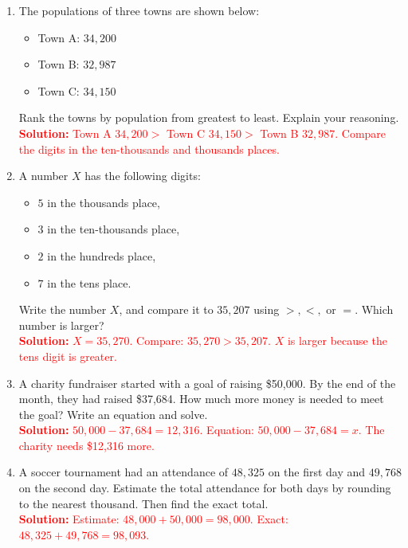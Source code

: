 \documentclass[12pt]{article}
\begin{document}
\vspace{1em}

\begin{tcolorbox}[colframe=black!60, colback=white, 
coltitle=black, colbacktitle=black!15, fonttitle=\bfseries\Large, 
title=Problems, halign title=center, left=10pt, right=10pt, top=10pt, bottom=60pt]
\begin{enumerate}[start=9, itemsep=3em]
    \item The populations of three towns are shown below:
    \begin{itemize}
        \item Town A: \( 34,200 \)
        \item Town B: \( 32,987 \)
        \item Town C: \( 34,150 \)
    \end{itemize}
    Rank the towns by population from greatest to least. Explain your reasoning.\\
    \textcolor{red}{\textbf{Solution:} Town A \(34,200 >\) Town C \(34,150 >\) Town B \(32,987\). Compare the digits in the ten-thousands and thousands places.}
    
    \item A number \( X \) has the following digits:
    \begin{itemize}
        \item \( 5 \) in the thousands place,
        \item \( 3 \) in the ten-thousands place,
        \item \( 2 \) in the hundreds place,
        \item \( 7 \) in the tens place.
    \end{itemize}
    Write the number \( X \), and compare it to \( 35,207 \) using \( >, <, \) or \( = \). Which number is larger?\\
    \textcolor{red}{\textbf{Solution:} \(X = 35,270\). Compare: \(35,270 > 35,207\). \(X\) is larger because the tens digit is greater.}
    
    \item A charity fundraiser started with a goal of raising \$50,000. By the end of the month, they had raised \$37,684. How much more money is needed to meet the goal? Write an equation and solve.\\
    \textcolor{red}{\textbf{Solution:} \(50,000 - 37,684 = 12,316\). Equation: \(50,000 - 37,684 = x\). The charity needs \$12,316 more.}
    
    \item A soccer tournament had an attendance of \( 48,325 \) on the first day and \( 49,768 \) on the second day. Estimate the total attendance for both days by rounding to the nearest thousand. Then find the exact total.\\
    \textcolor{red}{\textbf{Solution:} Estimate: \(48,000 + 50,000 = 98,000\). Exact: \(48,325 + 49,768 = 98,093\).}
\end{enumerate}
\end{tcolorbox}
\end{document}
